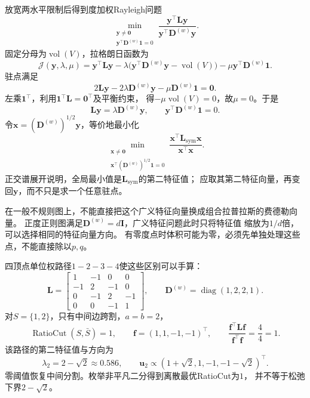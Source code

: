 放宽两水平限制后得到度加权Rayleigh问题
\begin{equation}
  \min_{\substack{\bm y\neq\bm0\\
       \bm y^\top\bm D^{(w)}\bm1=0}}
       \frac{\bm y^\top\bm L\bm y}{\bm y^\top\bm D^{(w)}\bm y}.
  \label{eq:graph-theory-normalized-cut-relaxation}
\end{equation}
固定分母为\(\operatorname{vol}(V)\)，拉格朗日函数为
\[
  \mathcal J(\bm y,\lambda,\mu)
  =\bm y^\top\bm L\bm y
  -\lambda\bigl(\bm y^\top\bm D^{(w)}\bm y-\operatorname{vol}(V)\bigr)
  -\mu\bm y^\top\bm D^{(w)}\bm1.
\]
驻点满足
\[
  2\bm L\bm y-2\lambda\bm D^{(w)}\bm y-\mu\bm D^{(w)}\bm1=\bm0.
\]
左乘\(\bm1^\top\)，利用\(\bm1^\top\bm L=\bm0^\top\)及平衡约束，
得\(-\mu\operatorname{vol}(V)=0\)，故\(\mu=0\)。于是
\begin{equation}
  \bm L\bm y=\lambda\bm D^{(w)}\bm y,\qquad
  \bm y^\top\bm D^{(w)}\bm1=0.
  \label{eq:graph-theory-normalized-cut-generalized-eigenproblem}
\end{equation}
令\(\bm x=(\bm D^{(w)})^{1/2}\bm y\)，等价地最小化
\[
  \min_{\substack{\bm x\neq\bm0\\
     \bm x^\top(\bm D^{(w)})^{1/2}\bm1=0}}
     \frac{\bm x^\top\bm L_{\mathrm{sym}}\bm x}{\bm x^\top\bm x}.
\]
正交谱展开说明，全局最小值是\(\bm L_{\mathrm{sym}}\)的第二特征值；
应取其第二特征向量，再变回\(\bm y\)，而不只是求一个任意驻点。

在一般不规则图上，不能直接把这个广义特征向量换成组合拉普拉斯的费德勒向量。
正度正则图满足\(\bm D^{(w)}=d\bm I\)，广义特征问题此时只将特征值
缩放为\(1/d\)倍，可以选择相同的特征向量方向。
有零度点时体积可能为零，必须先单独处理这些点，不能直接除以\(p,q\)。

四顶点单位权路径\(1-2-3-4\)使这些区别可以手算：
\[
  \bm L=
  \begin{bmatrix}
    1&-1&0&0\\
    -1&2&-1&0\\
    0&-1&2&-1\\
    0&0&-1&1
  \end{bmatrix},
  \qquad \bm D^{(w)}=\operatorname{diag}(1,2,2,1).
\]
对\(S=\{1,2\}\)，只有中间边跨割，\(a=b=2\)，
\[
  \operatorname{RatioCut}(S,\bar S)=1,\qquad
  \bm f=(1,1,-1,-1)^\top,\qquad
  \frac{\bm f^\top\bm L\bm f}{\bm f^\top\bm f}=\frac44=1.
\]
该路径的第二特征值与方向为
\[
  \lambda_2=2-\sqrt2\approx0.586,\qquad
  \bm u_2\propto(1+\sqrt2,1,-1,-1-\sqrt2)^\top.
\]
零阈值恢复中间分割。枚举非平凡二分得到离散最优RatioCut为\(1\)，
并不等于松弛下界\(2-\sqrt2\)。

